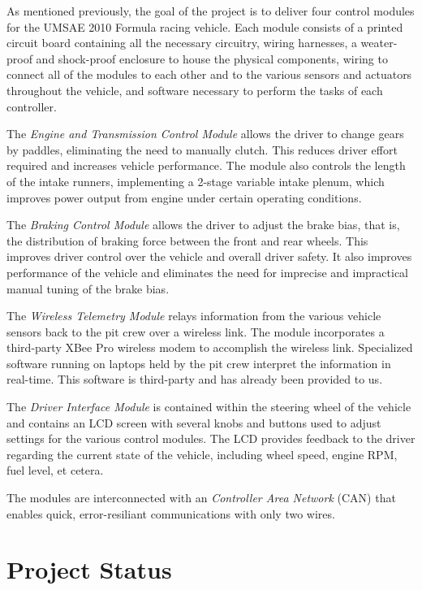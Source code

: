 \documentclass[12pt]{report}
\begin{document}
As mentioned previously, the goal of the project is to deliver four control modules for the UMSAE 2010 Formula racing vehicle. Each module consists of a printed circuit board containing all the necessary circuitry, wiring harnesses, a weater-proof and shock-proof enclosure to house the physical components, wiring to connect all of the modules to each other and to the various sensors and actuators throughout the vehicle, and software necessary to perform the tasks of each controller.

The \emph{Engine and Transmission Control Module} allows the driver to change gears by paddles, eliminating the need to manually clutch. This reduces driver effort required and increases vehicle performance. The module also controls the length of the intake runners, implementing a 2-stage variable intake plenum, which improves power output from engine under certain operating conditions.

The \emph{Braking Control Module} allows the driver to adjust the brake bias, that is, the distribution of braking force between the front and rear wheels. This improves driver control over the vehicle and overall driver safety. It also improves performance of the vehicle and eliminates the need for imprecise and impractical manual tuning of the brake bias.

The \emph{Wireless Telemetry Module} relays information from the various vehicle sensors back to the pit crew over a wireless link. The module incorporates a third-party XBee Pro wireless modem to accomplish the wireless link. Specialized software running on laptops held by the pit crew interpret the information in real-time. This software is third-party and has already been provided to us.

The \emph{Driver Interface Module} is contained within the steering wheel of the vehicle and contains an LCD screen with several knobs and buttons used to adjust settings for the various control modules. The LCD provides feedback to the driver regarding the current state of the vehicle, including wheel speed, engine RPM, fuel level, et cetera. 

The modules are interconnected with an \emph{Controller Area Network} (CAN) that enables quick, error-resiliant communications with only two wires.

\pagebreak

\section{Project Status}
\end{document}
